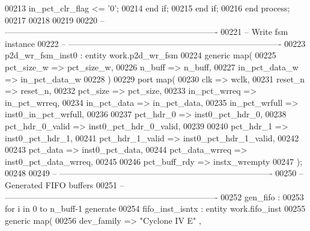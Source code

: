 \begin{DoxyCode}
00213          \textcolor{vhdlchar}{in_pct_clr_flag} \textcolor{vhdlchar}{<=} \textcolor{vhdlchar}{'}\textcolor{vhdllogic}{}\textcolor{vhdllogic}{0}\textcolor{vhdlchar}{'};
00214       \textcolor{keywordflow}{end} \textcolor{keywordflow}{if};
00215    \textcolor{keywordflow}{end} \textcolor{keywordflow}{if};
00216 \textcolor{keywordflow}{end} \textcolor{keywordflow}{process};
00217 
00218 
00219 
00220 \textcolor{keyword}{-- ----------------------------------------------------------------------------}
00221 \textcolor{keyword}{-- Write fsm instance}
00222 \textcolor{keyword}{-- ----------------------------------------------------------------------------}
00223 p2d\_wr\_fsm\_inst0 : \textcolor{keywordflow}{entity} work.p2d_wr_fsm
00224    \textcolor{keywordflow}{generic} \textcolor{keywordflow}{map}(
00225       pct_size_w        => pct_size_w,
00226       n_buff            => n_buff,
00227       in_pct_data_w     => in_pct_data_w
00228    \textcolor{vhdlchar}{)}
00229    \textcolor{keywordflow}{port} \textcolor{keywordflow}{map}(
00230       clk               => wclk,
00231       reset_n           => reset_n,
00232       pct_size          => pct_size, 
00233       in_pct_wrreq      => in_pct_wrreq,
00234       in_pct_data       => in_pct_data,
00235       in_pct_wrfull     => inst0_in_pct_wrfull,
00236 
00237       pct_hdr_0         => inst0_pct_hdr_0,
00238       pct_hdr_0_valid   => inst0_pct_hdr_0_valid,
00239 
00240       pct_hdr_1         => inst0_pct_hdr_1,
00241       pct_hdr_1_valid   => inst0_pct_hdr_1_valid,
00242 
00243       pct_data          => inst0_pct_data,
00244       pct_data_wrreq    => inst0_pct_data_wrreq,
00245 
00246       pct_buff_rdy      => instx_wrempty     
00247         \textcolor{vhdlchar}{)};
00248         
00249 \textcolor{keyword}{-- ----------------------------------------------------------------------------}
00250 \textcolor{keyword}{-- Generated FIFO buffers}
00251 \textcolor{keyword}{-- ----------------------------------------------------------------------------        }
00252 \textcolor{vhdlchar}{gen\_fifo} \textcolor{vhdlchar}{:}
00253    \textcolor{keywordflow}{for} \textcolor{vhdlchar}{i} \textcolor{keywordflow}{in} \textcolor{vhdllogic}{}\textcolor{vhdllogic}{0} \textcolor{keywordflow}{to} \textcolor{vhdlchar}{n_buff}\textcolor{vhdlchar}{-}\textcolor{vhdllogic}{}\textcolor{vhdllogic}{1} \textcolor{keywordflow}{generate}
00254       fifo\_inst\_isntx : \textcolor{keywordflow}{entity} work.fifo_inst
00255          \textcolor{keywordflow}{generic} \textcolor{keywordflow}{map}(
00256             dev_family      => \textcolor{keyword}{"Cyclone IV E"}  ,

\end{DoxyCode}

